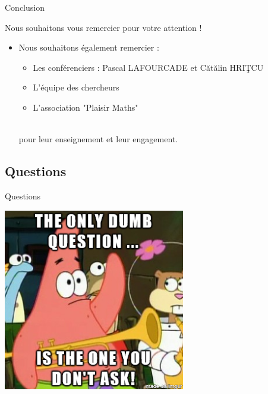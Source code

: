 \documentclass[aspectratio=43,11pt,hyperref={pdfpagemode=FullScreen}]{beamer}
\begin{document}
\begin{frame}{Conclusion}

\begin{overprint}

\begin{center}
   Nous souhaitons vous remercier pour votre attention !
\end{center}

\begin{itemize}
    \item Nous souhaitons également remercier :~\\ \vspace{0,5 cm}
        \begin{itemize}
            \item Les conférenciers : Pascal LAFOURCADE et  Cătălin HRIŢCU
            \item L'équipe des chercheurs
            \item L'association "Plaisir Maths" ~\\
        \end{itemize} ~\\
    pour leur enseignement et leur engagement.
\end{itemize}

\end{overprint}
\end{frame}

\subsection{Questions}

\begin{frame}{Questions}
\begin{center}
\includegraphics[scale=0.5]{Questions.png}   
\end{center}
\end{frame}

\end{document}
